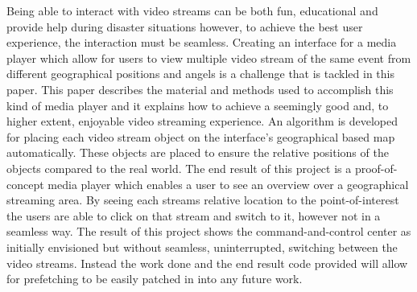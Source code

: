 Being able to interact with video streams can be both fun, educational and provide help during disaster situations however, to achieve the best user experience, the interaction must be seamless. Creating an interface for a media player which allow for users to view multiple video stream of the same event from different geographical positions and angels is a challenge that is tackled in this paper. This paper describes the material and methods used to accomplish this kind of media player and it explains how to achieve a seemingly good and, to higher extent, enjoyable video streaming experience. An algorithm is developed for placing each video stream object on the interface's geographical based map automatically. These objects are placed to ensure the relative positions of the objects compared to the real world. The end result of this project is a proof-of-concept media player which enables a user to see an overview over a geographical streaming area. By seeing each streams relative location to the point-of-interest the users are able to click on that stream and switch to it, however not in a seamless way. The result of this project shows the command-and-control center as initially envisioned but without seamless, uninterrupted, switching between the video streams. Instead the work done and the end result code provided will allow for prefetching to be easily patched in into any future work.